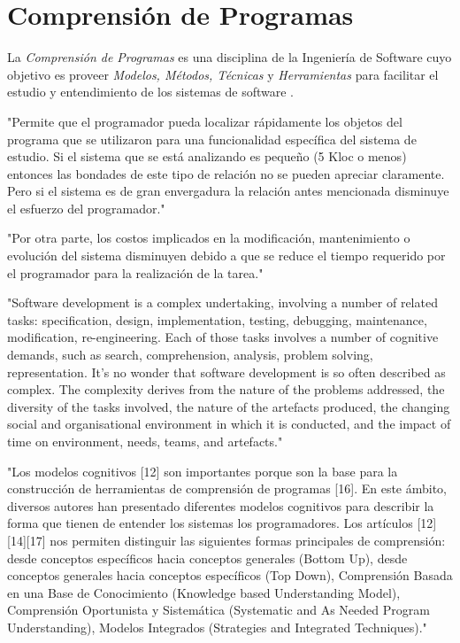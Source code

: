 \chapter{Comprensión de Programas}

La \textit{Comprensión de Programas} es una disciplina de la Ingeniería de Software
cuyo objetivo es proveer \textit{Modelos, Métodos, Técnicas} y \textit{Herramientas}
para facilitar el estudio y entendimiento de los sistemas de software \cite{BeronHenriquesPereiraXX}.

"Permite que el programador pueda localizar rápidamente los objetos del programa que se
utilizaron para una funcionalidad específica del sistema de estudio.
Si el sistema que se está analizando es pequeño (5 Kloc o menos) entonces las bondades 
de este tipo de relación no se pueden apreciar claramente.
Pero si el sistema es de gran envergadura la relación antes mencionada disminuye el
esfuerzo del programador."\cite{BeronHenriquesPereiraXX}

"Por otra parte, los costos implicados en la modificación, mantenimiento o evolución
del sistema disminuyen debido a que se reduce el tiempo requerido por el programador
para la realización de la tarea."\cite{BeronHenriquesPereiraXX}

"Software development is a complex undertaking, involving a number of related tasks: specification,
design, implementation, testing, debugging, maintenance, modification, re-engineering. Each of those
tasks involves a number of cognitive demands, such as search, comprehension, analysis, problem
solving, representation. It’s no wonder that software development is so often described as complex.
The complexity derives from the nature of the problems addressed, the diversity of the tasks involved,
the nature of the artefacts produced, the changing social and organisational environment in which it is
conducted, and the impact of time on environment, needs, teams, and artefacts."\cite{PetreDeQuency06}

"Los modelos cognitivos [12] son importantes porque son la base para la construcción de herramientas
de comprensión de programas [16].
En este ámbito, diversos autores han presentado diferentes modelos cognitivos para describir
la forma que tienen de entender los sistemas los programadores.
Los artículos [12][14][17] nos permiten distinguir las siguientes formas principales de comprensión:
desde conceptos específicos hacia conceptos generales (Bottom Up), desde conceptos generales
hacia conceptos específicos (Top Down), Comprensión Basada en una Base de Conocimiento (Knowledge
based Understanding Model), Comprensión Oportunista y Sistemática (Systematic and As Needed Program
Understanding), Modelos Integrados (Strategies and Integrated Techniques)."
\cite{BeronHenriquesPereiraUzalXX}

